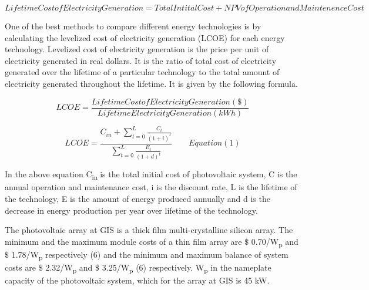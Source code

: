 \documentclass[12pt]{article}
\begin{document}
\begin{justify}
 \[ Lifetime Cost of Electricity Generation=Total Intital Cost+NPV of Operation and Maintenence Cost \] 
\end{justify}\par

\begin{justify}
One of the best methods to compare different energy technologies is by calculating the levelized cost of electricity generation (LCOE) for each energy technology. Levelized cost of electricity generation is the price per unit of electricity generated in real dollars. It is the ratio of total cost of electricity generated over the lifetime of a particular technology to the total amount of electricity generated throughout the lifetime. It is given by the following formula.
\end{justify}\par

\begin{justify}
 \[ LCOE=\frac{Lifetime Cost of Electricity Generation  \left( \$ \right) }{Lifetime Electricity Generation  \left( kWh \right) } \] 
\end{justify}\par

\begin{justify}
 \[ LCOE=\frac{C_{in}+ \sum _{t=0}^{L}\frac{C_{t}}{ \left( 1+i \right) ^{t}}}{ \sum _{t=0}^{L}\frac{E_{t}}{ \left( 1+d \right) ^{t}}}~~~~~~~~~ Equation  \left( 1 \right)  \] 
\end{justify}\par

\begin{justify}
In the above equation C\textsubscript{in\textit{ }}is the total initial cost of photovoltaic system, C is the annual operation and maintenance cost, i is the discount rate, L is the lifetime of the technology, E is the amount of energy produced annually and d is the decrease in energy production per year over lifetime of the technology.
\end{justify}\par


\vspace{\baselineskip}
\begin{justify}
The photovoltaic array at GIS is a thick film multi-crystalline silicon array. The minimum and the maximum module costs of a thin film array are $\$$ 0.70/W\textsubscript{p} and $\$$ 1.78/W\textsubscript{p }respectively (6) and the minimum and maximum balance of system costs are $\$$ 2.32/W\textsubscript{p} and $\$$ 3.25/W\textsubscript{p }(6)\textsubscript{ }respectively. W\textsubscript{p} in the nameplate capacity of the photovoltaic system, which for the array at GIS is 45 kW. 
\end{justify}\par
\end{document}
